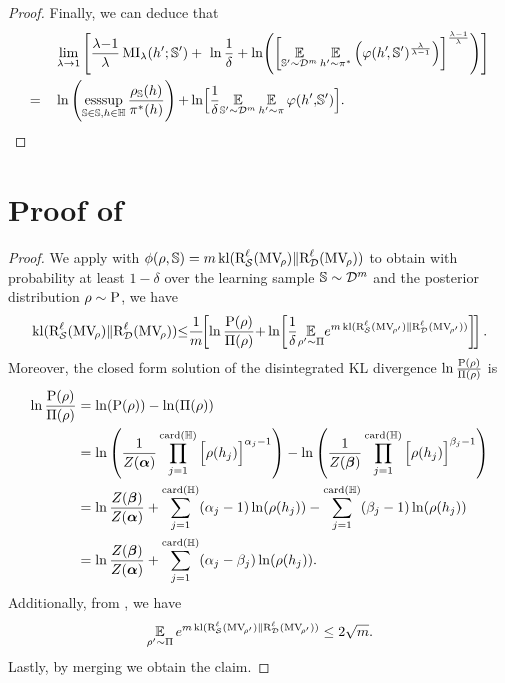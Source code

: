 \begin{noaddcontents}
\begin{proof}
Finally, we can deduce that 
\begin{align*}
    & \lim_{\lambda\rightarrow 1}\LB \frac{\lambda{-}1}{\lambda}\MI_{\lambda}(\h'; \S') +\ \ln\frac{1}{\delta} + \ln\!\LP\LB\EE_{\S'{\sim}\D^{\m}}\EE_{\h'{\sim} \P^*}\LP\varphi(\h'\!, \S')^{\frac{\lambda}{\lambda-1}}\RP\RB^{\frac{\lambda{-}1}{\lambda}}\RP\RB\\ 
    =\quad &\ln\LP\esssup_{\S\in\S, h\in\H}\frac{\AQ(\h)}{\P^*(\h)}\RP{+}\ln\!\Big[\frac{1}{\delta} {\displaystyle \EE_{\S'{\sim}\D^{\m}}\EE_{\h'{\sim}\P}\varphi(\h'{,}\S')}\Big].
\end{align*}
\end{proof}

\section{Proof of }
\label{ap:dis-pra:sec:proof-disintegrated-riv-mv}

\corollarydisintegratedrivmv*
\begin{proof}
We apply  with $\phi(\rho,\mathbb{S})=m\operatorname{kl}(\text{R}^{\ell}_{\mathcal{S}}(\text{MV}_{\!\rho})\|\text{R}^{\ell}_{\mathcal{D}}(\text{MV}_{\!\rho}))$ to obtain with probability at least $1{-}\delta$ over the learning sample $\mathbb{S}\sim\mathcal{D}^m$ and the posterior distribution $\rho\sim\mathrm{P}$, we have 
\begin{align}
    \kl(\RiskLoss_{\dS}(\MVQ)\|\RiskLoss_{\D}(\MVQ)){\le}\frac{1}{\m}\!\!\LB \ln\frac{\hyperQ(\Q)}{\hyperP(\Q)}{+}\ln\!\LB\frac{1}{\delta} \!\EE_{\Qp\sim\hyperP}\!e^{\m\kl(\RiskLoss_{\dS}(\MVQp)\|\RiskLoss_{\D}(\MVQp))}\RB\!\RB.\label{ap:dis-pra:eq:proof-disintegrated-riv-mv-1}
\end{align}
Moreover, the closed form solution of the disintegrated KL divergence $\ln\frac{\mathrm{P}(\rho)}{\Pi(\rho)}$ is
\begin{align}
    \ln\frac{\mathrm{P}(\rho)}{\Pi(\rho)} &= \ln(\mathrm{P}(\rho)) - \ln(\Pi(\rho))\nonumber\\
    &= \ln\left(\frac{1}{Z(\boldsymbol{\alpha})}\prod_{j=1}^{\operatorname{card}(\mathbb{H})} \Big[\rho(h_j)\Big]^{\alpha_j-1}\right) - \ln\left(\frac{1}{Z(\boldsymbol{\beta})}\prod_{j=1}^{\operatorname{card}(\mathbb{H})} \Big[\rho(h_j)\Big]^{\beta_j-1}\right)\nonumber\\
    &= \ln\frac{Z(\boldsymbol{\beta})}{Z(\boldsymbol{\alpha})} + \sum_{j=1}^{\operatorname{card}(\mathbb{H})}(\alpha_j-1)\ln(\rho(h_j)) - \sum_{j=1}^{\operatorname{card}(\mathbb{H})}(\beta_j-1)\ln(\rho(h_j))\nonumber\\
    &= \ln\frac{Z(\boldsymbol{\beta})}{Z(\boldsymbol{\alpha})} + \sum_{j=1}^{\operatorname{card}(\mathbb{H})}(\alpha_j-\beta_j)\ln(\rho(h_j)).\label{ap:dis-pra:eq:proof-disintegrated-riv-mv-2}
\end{align}
Additionally, from , we have 
\begin{align}
    \operatorname*{\mathbb{E}}_{\rho'\sim\Pi}e^{m\operatorname{kl}(\text{R}^{\ell}_{\mathcal{S}}(\text{MV}_{\!\rho'})\|\text{R}^{\ell}_{\mathcal{D}}(\text{MV}_{\!\rho'}))} \le 2\sqrt{m}.\label{ap:dis-pra:eq:proof-disintegrated-riv-mv-3}
\end{align}
Lastly, by merging  we obtain the claim.
\end{proof}


\end{noaddcontents}
